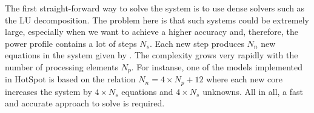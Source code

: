 The first straight-forward way to solve the system is to use dense solvers such as the LU decomposition. The problem here is that such systems could be extremely large, especially when we want to achieve a higher accuracy and, therefore, the power profile contains a lot of steps $N_s$. Each new step produces $N_n$ new equations in the system given by . The complexity grows very rapidly with the number of processing elements $N_p$. For instanse, one of the models implemented in HotSpot is based on the relation $N_n = 4 \times N_p + 12$ where each new core increases the system by $4 \times N_s$ equations and $4 \times N_s$ unknowns. All in all, a fast and accurate approach to solve  is required.
